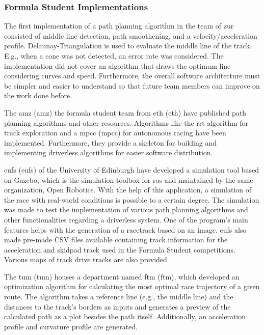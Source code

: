 \subsubsection{Formula Student Implementations} \label{sec:Formula Student Implementations}
The first implementation of a path planning algorithm in the team of \acrlong{zur} consisted of middle line detection, path smoothening, and a velocity/acceleration profile. Delaunay-Triangulation is used to evaluate the middle line of the track. E.g., when a cone was not detected, an error rate was considered. The implementation did not cover an algorithm that draws the optimum line considering curves and speed. Furthermore, the overall software architecture must be simpler and easier to understand so that future team members can improve on the work done before.
\cite{autopilot_for_formula_student_jerome}

The \acrshort{amz} (\acrlong{amz}) the formula student team from \acrshort{eth} (\acrlong{eth}) have published path planning algorithms and other resources. Algorithms like the \acrshort{rrt} algorithm for track exploration and a \acrlong{mpcc} (\acrshort{mpcc}) for autonomous racing have been implemented. Furthermore, they provide a skeleton for building and implementing driverless algorithms for easier software distribution.
\cite{amz_racing_github}

\acrlong{eufs} (\acrshort{eufs}) of the University of Edinburgh have developed a simulation tool based on Gazebo, which is the simulation toolbox for \acrshort{ros} and maintained by the same organization, Open Robotics. With the help of this application, a simulation of the race with real-world conditions is possible to a certain degree. The simulation was made to test the implementation of various path planning algorithms and other functionalities regarding a driverless system. One of the program's main features helps with the generation of a racetrack based on an image. \acrshort{eufs} also made pre-made CSV files available containing track information for the acceleration and skidpad track used in the Formula Student competitions. Various maps of track drive tracks are also provided. \cite{eufs_path_planning_and_control} \cite{eufs_sim_gitlab}

The \acrlong{tum} (\acrshort{tum}) houses a department named \acrlong{ftm} (\acrshort{ftm}), which developed an optimization algorithm for calculating the most optimal race trajectory of a given route. The algorithm takes a reference line (e.g., the middle line) and the distances to the track's borders as inputs and generates a preview of the calculated path as a plot besides the path itself. Additionally, an acceleration profile and curvature profile are generated. \cite{minimum_curvature_trajectory_planning} \cite{minimum_time_trajectory_planning} \cite{tumftm_optimization_algoritm} \cite{tumftm_trajectory_planning_helpers}

